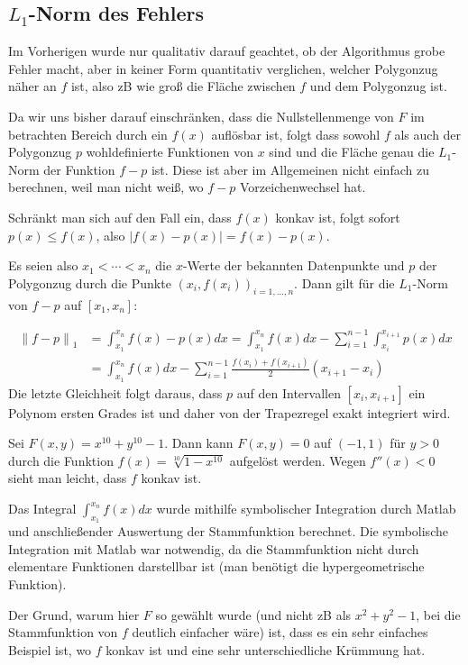 \documentclass[a4paper,11pt,bibliography=totoc,listof=totoc,headinclude=true,cleardoublepage=empty,oneside]{scrartcl}
\newcommand{\norm}[2]{\left\| #1 \right\|_{#2}}
\begin{document}
\subsection{$L_1$-Norm des Fehlers}
Im Vorherigen wurde nur qualitativ darauf geachtet, ob der Algorithmus grobe Fehler macht, aber in keiner Form quantitativ verglichen, welcher Polygonzug näher an $f$ ist, also zB wie groß die Fläche zwischen $f$ und dem Polygonzug ist.

Da wir uns bisher darauf einschränken, dass die Nullstellenmenge von $F$ im betrachten Bereich durch ein $f(x)$ auflösbar ist, folgt dass sowohl $f$ als auch der Polygonzug $p$ wohldefinierte Funktionen von $x$ sind und die Fläche genau die $L_1$-Norm der Funktion $f-p$ ist. Diese ist aber im Allgemeinen nicht einfach zu berechnen, weil man nicht weiß, wo $f-p$ Vorzeichenwechsel hat. 

Schränkt man sich auf den Fall ein, dass $f(x)$ konkav ist, folgt sofort $p(x) \le f(x)$, also $|f(x)-p(x)|=f(x)-p(x)$.

Es seien also $x_1<\cdots < x_n$ die $x$-Werte der bekannten Datenpunkte und $p$ der Polygonzug durch die Punkte $(x_i,f(x_i))_{i=1,\dots,n}$. Dann gilt für die $L_1$-Norm von $f-p$ auf $[x_1,x_n]$:

\begin{align*}
\norm{f-p}{1} &= \int_{x_1}^{x_n}\!\! f(x)-p(x) dx = \int_{x_1}^{x_n}\!\! f(x) dx - \sum_{i=1}^{n-1} \int_{x_i}^{x_{i+1}}\!\! p(x) dx \\
&=  \int_{x_1}^{x_n}\!\! f(x) dx - \sum_{i=1}^{n-1} \frac{f(x_{i})+f(x_{i+1})}{2} (x_{i+1}-x_i)
\end{align*}
Die letzte Gleichheit folgt daraus, dass $p$ auf den Intervallen $[x_i,x_{i+1}]$ ein Polynom ersten Grades ist und daher von der Trapezregel exakt integriert wird. 

Sei $F(x,y)= x^{10} +y^{10}-1$. Dann kann $F(x,y)=0$ auf $(-1,1)$ für $y>0$ durch die Funktion $f(x)= \sqrt[10]{1-x^{10}}$ aufgelöst werden. Wegen $f''(x) <0$ sieht man leicht, dass $f$ konkav ist. 

Das Integral $ \int_{x_1}^{x_n}\!\! f(x) dx$ wurde mithilfe symbolischer Integration durch Matlab und anschließender Auswertung der Stammfunktion berechnet. Die symbolische Integration mit Matlab war notwendig, da die Stammfunktion nicht durch elementare Funktionen darstellbar ist (man benötigt die hypergeometrische Funktion). 

Der Grund, warum hier $F$ so gewählt wurde (und nicht zB als $x^2+y^2-1$, bei die Stammfunktion von $f$ deutlich einfacher wäre) ist, dass es ein sehr einfaches Beispiel ist, wo $f$ konkav ist und eine sehr unterschiedliche Krümmung hat. 
\end{document}
